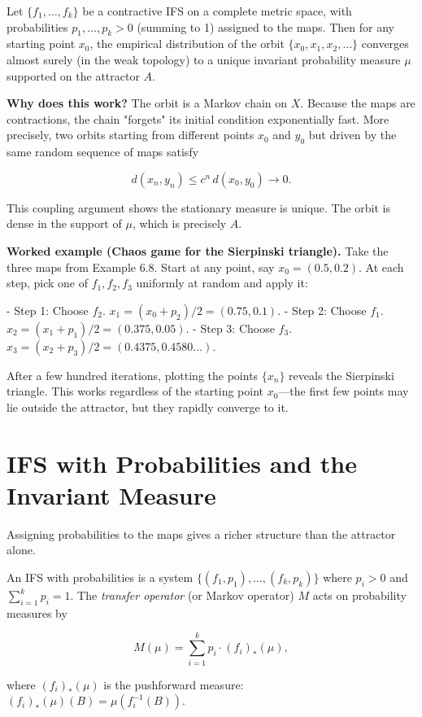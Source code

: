 \begin{theorem}
Let $\{ f_1, \ldots, f_k\} $ be a contractive IFS on a complete metric space, with probabilities $p_1, \ldots, p_k > 0$ (summing to 1) assigned to the maps. Then for any starting point $x_0$, the empirical distribution of the orbit $\{ x_0, x_1, x_2, \ldots\} $ converges almost surely (in the weak topology) to a unique invariant probability measure $\mu$ supported on the attractor $A$.

\textbf{Why does this work?} The orbit is a Markov chain on $X$. Because the maps are contractions, the chain "forgets" its initial condition exponentially fast. More precisely, two orbits starting from different points $x_0$ and $y_0$ but driven by the same random sequence of maps satisfy

\[d(x_n, y_n) \le c^n \, d(x_0, y_0) \to 0.\]

This coupling argument shows the stationary measure is unique. The orbit is dense in the support of $\mu$, which is precisely $A$.

\textbf{Worked example (Chaos game for the Sierpinski triangle).} Take the three maps from Example 6.8. Start at any point, say $x_0 = (0.5, 0.2)$. At each step, pick one of $f_1, f_2, f_3$ uniformly at random and apply it:

- Step 1: Choose $f_2$. $x_1 = (x_0 + p_2)/2 = (0.75, 0.1)$.
- Step 2: Choose $f_1$. $x_2 = (x_1 + p_1)/2 = (0.375, 0.05)$.
- Step 3: Choose $f_3$. $x_3 = (x_2 + p_3)/2 = (0.4375, 0.4580\ldots)$.

After a few hundred iterations, plotting the points $\{ x_n\} $ reveals the Sierpinski triangle. This works regardless of the starting point $x_0$—the first few points may lie outside the attractor, but they rapidly converge to it.
\end{theorem}

\section{IFS with Probabilities and the Invariant Measure}

Assigning probabilities to the maps gives a richer structure than the attractor alone.

\begin{definition}
An IFS with probabilities is a system $\{ (f_1, p_1), \ldots, (f_k, p_k)\} $ where $p_i > 0$ and $\sum_{i=1}^k p_i = 1$. The \textit{transfer operator} (or Markov operator) $M$ acts on probability measures by

\[M(\mu) = \sum_{i=1}^{k} p_i \cdot (f_i)_{*}(\mu),\]

where $(f_i)_{*}(\mu)$ is the pushforward measure: $(f_i)_{*}(\mu)(B) = \mu(f_i^{-1}(B))$.
\end{definition}

